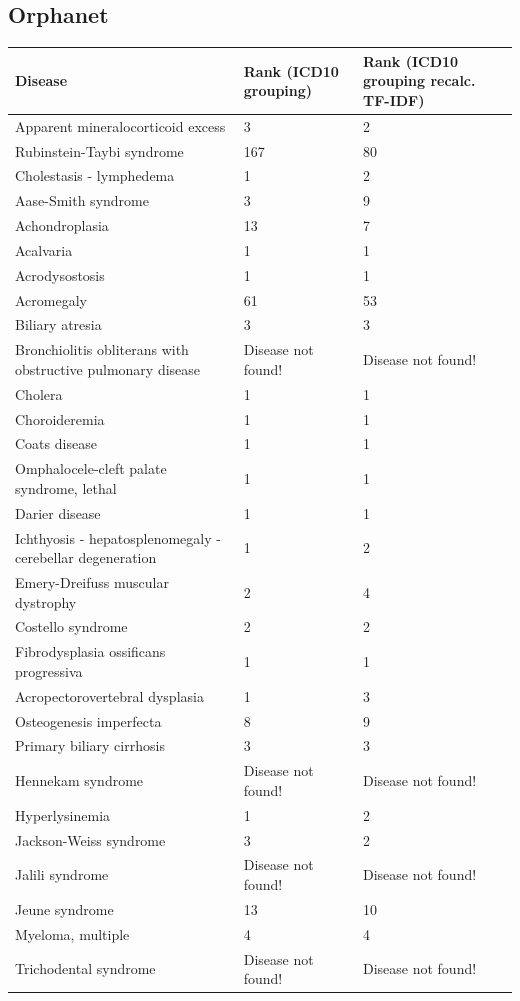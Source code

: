\documentclass[10pt,letterpaper,final]{article}
\begin{document}
\subsection{Orphanet}
\label{app:orphanet_icd10_icd10recalc}
\begin{center}
\begin{small}
	\begin{longtable}{|p{6cm}|p{2.5cm}|p{2.5cm}|}
	\hline
	\textbf{Disease}  & \textbf{Rank (ICD10 grouping)} & \textbf{Rank (ICD10 grouping recalc. TF-IDF)} \\
	\hline\hline
Apparent mineralocorticoid excess & 3 & 2\\    \hline
Rubinstein-Taybi syndrome & 167 & 80\\    \hline
Cholestasis - lymphedema & 1 & 2\\    \hline
Aase-Smith syndrome & 3 & 9\\    \hline
Achondroplasia & 13 & 7\\    \hline
Acalvaria & 1 & 1\\    \hline
Acrodysostosis & 1 & 1\\    \hline
Acromegaly & 61 & 53\\    \hline
Biliary atresia & 3 & 3\\    \hline
Bronchiolitis obliterans with obstructive pulmonary disease & Disease not found!  & Disease not found!\\    \hline
Cholera & 1 & 1\\    \hline
Choroideremia & 1 & 1\\    \hline
Coats disease & 1 & 1\\    \hline
Omphalocele-cleft palate syndrome, lethal & 1 & 1\\    \hline
Darier disease & 1 & 1\\    \hline
Ichthyosis - hepatosplenomegaly - cerebellar degeneration & 1 & 2\\    \hline
Emery-Dreifuss muscular dystrophy & 2 & 4\\    \hline
Costello syndrome & 2 & 2\\    \hline
Fibrodysplasia ossificans progressiva & 1 & 1\\    \hline
Acropectorovertebral dysplasia & 1 & 3\\    \hline
Osteogenesis imperfecta & 8 & 9\\    \hline
Primary biliary cirrhosis & 3 & 3\\    \hline
Hennekam syndrome & Disease not found!  & Disease not found!\\    \hline
Hyperlysinemia & 1 & 2\\    \hline
Jackson-Weiss syndrome & 3 & 2\\    \hline
Jalili syndrome & Disease not found!  & Disease not found!\\    \hline
Jeune syndrome & 13 & 10\\    \hline
Myeloma, multiple & 4 & 4\\    \hline
Trichodental syndrome & Disease not found!  & Disease not found!\\    \hline
	\end{longtable}
	\label{tab:orphanet_icd10_icd10recalc}
\end{small}
\end{center}
\end{document}
